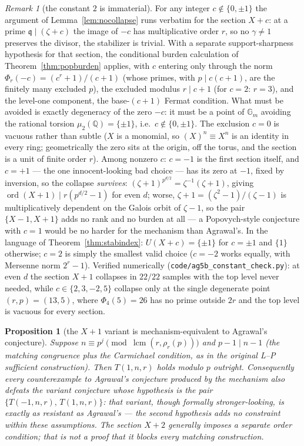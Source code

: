 \documentclass[11pt]{article}
\newtheorem{proposition}[theorem]{Proposition}
\theoremstyle{remark}
\newtheorem{remark}[theorem]{Remark}
\newcommand{\Q}{\mathbb{Q}}
\newcommand{\Gm}{\mathbb{G}_m}
\DeclareMathOperator{\lcm}{lcm}
\DeclareMathOperator{\ord}{ord}
\begin{document}
\begin{remark}[the constant $2$ is immaterial]\label{rem:constant}
For any integer $c \notin \{0, \pm 1\}$ the argument of
Lemma~\ref{lem:nocollapse} runs verbatim for the section $X + c$: at a
prime $\mathfrak q \mid (\zeta + c)$ the image of $-c$ has multiplicative
order $r$, so no $\gamma \ne 1$ preserves the divisor, the stabilizer is
trivial. With a separate support-sharpness hypothesis for that section,
the conditional burden calculation of Theorem~\ref{thm:popburden} applies,
with $c$ entering only through the norm $\Phi_r(-c) = (c^r + 1)/(c + 1)$
(whose primes, with $p \mid c(c+1)$, are the finitely many excluded $p$),
the excluded modulus $r \mid c + 1$ (for $c = 2$: $r = 3$), and the
level-one component, the base-$(c{+}1)$ Fermat condition. What must be
avoided is exactly degeneracy of the zero $-c$: it must be a point of
$\Gm$ avoiding the rational torsion $\mu_2(\Q) = \{\pm 1\}$, i.e.\
$c \notin \{0, \pm 1\}$. The exclusion $c = 0$ is vacuous rather than
subtle ($X$ is a monomial, so $(X)^n \equiv X^n$ is an identity in every
ring; geometrically the zero sits at the origin, off the torus, and the
section is a unit of finite order $r$). Among nonzero $c$:
$c = -1$ is the first section itself, and $c = +1$ --- the one
innocent-looking bad choice --- has its zero at $-1$, fixed by inversion,
so the collapse \emph{survives}: $(\zeta + 1)^{p^{d/2}} =
\zeta^{-1}(\zeta + 1)$, giving $\ord(X + 1) \mid r(p^{d/2} - 1)$ for even
$d$; worse, $\zeta + 1 = (\zeta^2 - 1)/(\zeta - 1)$ is multiplicatively
dependent on the Galois orbit of $\zeta - 1$, so the pair
$\{X - 1, X + 1\}$ adds no rank and no burden at all --- a Popovych-style
conjecture with $c = 1$ would be no harder for the mechanism than
Agrawal's. In the language of Theorem~\ref{thm:stabindex}:
$U(X + c) = \{\pm 1\}$ for $c = \pm 1$ and $\{1\}$ otherwise; $c = 2$ is
simply the smallest valid choice ($c = -2$ works equally, with Mersenne
norm $2^r - 1$). Verified numerically
(\texttt{code/ag5b\_constant\_check.py}): at even $d$ the section $X + 1$
collapses in $22/22$ samples with the top level never needed, while
$c \in \{2, 3, -2, 5\}$ collapse only at the single degenerate point
$(r, p) = (13, 5)$, where $\Phi_4(5) = 26$ has no prime outside $2r$ and
the top level is vacuous for every section.
\end{remark}


\begin{proposition}[the $X+1$ variant is mechanism-equivalent to
Agrawal's conjecture]\label{prop:xplus1}
Suppose $n \equiv p^{j} \pmod{\lcm(r, \rho_r(p))}$ and $p - 1 \mid n - 1$
(the matching congruence plus the Carmichael condition, as in the original
L--P sufficient construction). Then $T(1, n, r)$ holds modulo
$p$ outright. Consequently every counterexample to Agrawal's conjecture
produced by the mechanism also defeats the variant conjecture whose
hypothesis is the pair $\{T(-1,n,r),\, T(1,n,r)\}$: that variant, though
formally stronger-looking, is exactly as resistant as Agrawal's --- the
second hypothesis adds no constraint within these assumptions. The section
$X+2$ generally imposes a separate order condition; that is not a proof
that it blocks every matching construction.
\end{proposition}
\end{document}
